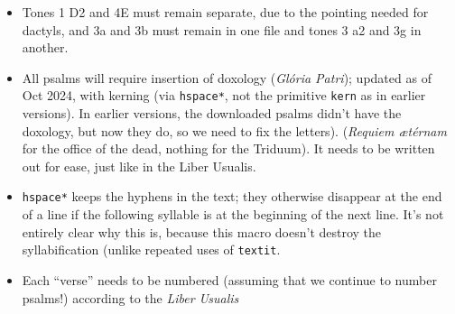 \documentclass[11pt]{article}
\begin{document}
\begin{itemize}
\item Tones 1 D2 and 4E must remain separate, due to the pointing needed for dactyls, and 3a and 3b must remain in one file and tones 3 a2 and 3g in another.
  \item All psalms will require insertion of doxology (\textit{Glória Patri}); updated as of Oct 2024, with kerning (via \verb|hspace*|, not the primitive \verb|kern| as in earlier versions). In earlier versions, the downloaded psalms didn't have the doxology, but now they do, so we need to fix the letters). (\textit{Requiem ætérnam} for the office of the dead, nothing for the Triduum). It needs to be written out for ease, just like in the Liber Usualis.
  \item  \verb|hspace*| keeps the hyphens in the text; they otherwise disappear at the end of a line if the following syllable is at the beginning of the next line. It's not entirely clear why this is, because this macro doesn't destroy the syllabification (unlike repeated uses of \verb|textit|.
  
   \item Each ``verse'' needs to be numbered (assuming that we continue to number psalms!) according to the \textit{Liber Usualis}
 

\end{itemize}
\end{document}
